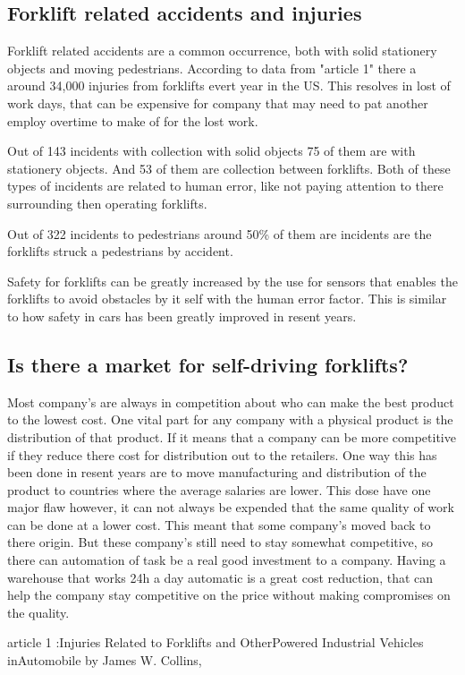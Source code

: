 \documentclass[11pt]{article}
\begin{document}
    \subsection{Forklift related accidents and injuries}
    Forklift related accidents are a common occurrence, both with solid
    stationery objects and moving pedestrians. According to data from "article
    1" there a around 34,000 injuries from forklifts evert year in the US. This
    resolves in lost of work days, that can be expensive for company that may
    need to pat another employ overtime to make of for the lost work.

    Out of 143 incidents with collection with solid objects 75 of them are with
    stationery objects. And 53 of them are collection between forklifts. Both
    of these types of incidents are related to human error, like not paying
    attention to there surrounding then operating forklifts.

    Out of 322 incidents to pedestrians around 50\% of them are incidents are
    the forklifts struck a pedestrians by accident.

    Safety for forklifts can be greatly increased by the use for sensors that
    enables the forklifts to avoid obstacles by it self with the human error
    factor. This is similar to how safety in cars has been greatly improved in
    resent years.

    \subsection{Is there a market for self-driving forklifts?}
    Most company's are always in competition about who can make the best
    product to the lowest cost. One vital part for any company with a physical
    product is the distribution of that product. If it means that a company can
    be more competitive if they reduce there cost for distribution out to the
    retailers. One way this has been done in resent years are to move
    manufacturing and distribution of the product to countries where the
    average salaries are lower. This dose have one major flaw however, it can
    not always be expended that the same quality of work can be done at a lower
    cost. This meant that some company's moved back to there origin. But these
    company's still need to stay somewhat competitive, so there can automation
    of task be a real good investment to a company. Having a warehouse that
    works 24h a day automatic is a great cost reduction, that can help the
    company stay competitive on the price without making compromises on the
    quality.    

    article 1 :Injuries Related to Forklifts and OtherPowered Industrial
    Vehicles inAutomobile  by James W. Collins,
\end{document}
